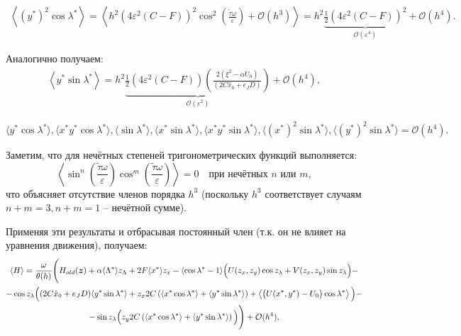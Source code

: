 \begin{equation*}
\begin{aligned}
\left\langle (y^*)^2 \cos \lambda^* \right\rangle = \left\langle h^2 \left( 4\varepsilon^2(C-F) \right)^2 \cos^2 \left( \frac{\tilde \tau \omega}{\varepsilon} \right) + \mathcal{O}(h^3) \right\rangle = h^2 \underbrace{\frac12 \left( 4\varepsilon^2(C-F) \right)^2}_{\mathcal{O}(\varepsilon^4)} + \mathcal{O}(h^4).
\end{aligned}
\end{equation*}

Аналогично получаем:
\begin{equation*}
\begin{aligned}
\left\langle y^* \sin \lambda^* \right\rangle = h^2 \underbrace{\frac12 \left( 4\varepsilon^2(C-F) \right) \left( \frac{2(\xi^2-\alpha U_0)}{(2C \hat x_0 + e_J D)} \right)}_{\mathcal{O}(\varepsilon^2)} + \mathcal{O}(h^4),
\end{aligned}
\end{equation*}

$$\langle y^* \cos \lambda^* \rangle, \langle x^* y^* \cos \lambda^* \rangle, \langle \sin \lambda^* \rangle, \langle x^* \sin \lambda^* \rangle, \langle x^* y^* \sin \lambda^* \rangle, \langle (x^*)^2 \sin \lambda^* \rangle, \langle (y^*)^2 \sin \lambda^* \rangle = \mathcal{O}(h^4).$$

Заметим, что для нечётных степеней тригонометрических функций выполняется:
    \[
    \left\langle \sin^n \left( \frac{\tilde \tau \omega}{\varepsilon} \right) \cos^m \left( \frac{\tilde \tau \omega}{\varepsilon} \right) \right\rangle = 0 \quad \text{при нечётных } n \text{ или } m,
    \]
    что объясняет отсутствие членов порядка $h^3$ (поскольку $h^3$ соответствует случаям $n+m=3, n+m=1$ -- нечётной сумме).

Применяя эти результаты и отбрасывая постоянный член (т.к. он не влияет на уравнения движения), получаем:
\begin{multline}
\langle H \rangle = \frac{\omega}{\theta(h)} \Bigg( H_{old}(\boldsymbol{z}) + \alpha \langle \Lambda^* \rangle z_\Lambda + 2F \langle x^* \rangle z_x - \langle \cos \lambda^* -1 \rangle \Big( U(z_x,z_y) \cos z_\lambda + V(z_x,z_y) \sin z_\lambda \Big) - \\
- \cos z_\lambda \Big( (2C \hat x_0 + e_J D) \langle y^* \sin \lambda^* \rangle + z_x 2C \left( \left\langle x^* \cos \lambda^* \right\rangle + \left\langle y^* \sin \lambda^* \right\rangle \right) + \left\langle \big( U(x^*,y^*) - U_0 \big) \cos \lambda^* \right\rangle \Big) - \\
- \sin z_\lambda \Big( z_y 2C \left( \left\langle x^* \cos \lambda^* \right\rangle + \left\langle y^* \sin \lambda^* \right\rangle \right) \Big) \Bigg) + \mathcal{O}(h^4),
\label{ham_uncut}
\end{multline}

